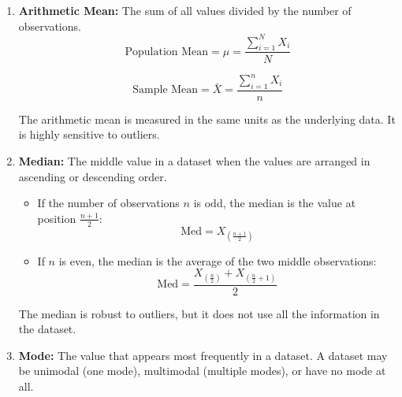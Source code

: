 \begin{enumerate}
	\item \textbf{Arithmetic Mean:} The sum of all values divided by the number of observations.
	\begin{equation}
		\text{Population Mean} = \mu = \frac{\sum_{i=1}^{N} X_i}{N}
		\label{eq:pop_mean_m5}
	\end{equation}
	
	\begin{equation}
		\text{Sample Mean} = \bar{X} = \frac{\sum_{i=1}^{n} X_i}{n}
		\label{eq:sample_mean_m5}
	\end{equation}
	
	The arithmetic mean is measured in the same units as the underlying data. It is highly sensitive to outliers.

	\item \textbf{Median:} The middle value in a dataset when the values are arranged in ascending or descending order.
	\begin{itemize}
		\item If the number of observations $n$ is odd, the median is the value at position $\frac{n+1}{2}$:
		\begin{equation}
			\text{Med} = X_{\left(\frac{n+1}{2}\right)}
			\label{eq:median_odd_m5}
		\end{equation}
		\item If $n$ is even, the median is the average of the two middle observations:
		\begin{equation}
			\text{Med} = \frac{X_{\left(\frac{n}{2}\right)} + X_{\left(\frac{n}{2}+1\right)}}{2}
			\label{eq:median_even_m5}
		\end{equation}
	\end{itemize}
	The median is robust to outliers, but it does not use all the information in the dataset.

	\item \textbf{Mode:} The value that appears most frequently in a dataset. A dataset may be unimodal (one mode), multimodal (multiple modes), or have no mode at all.
\end{enumerate}

